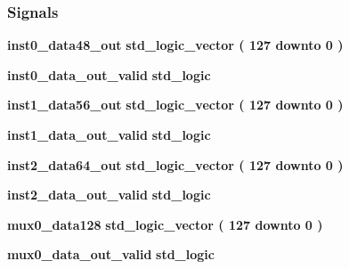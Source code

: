 \subsubsection*{Signals}
 \begin{DoxyCompactItemize}
\item 
{\bf inst0\+\_\+data48\+\_\+out} {\bfseries \textcolor{comment}{std\+\_\+logic\+\_\+vector}\textcolor{vhdlchar}{ }\textcolor{vhdlchar}{(}\textcolor{vhdlchar}{ }\textcolor{vhdlchar}{ } \textcolor{vhdldigit}{127} \textcolor{vhdlchar}{ }\textcolor{keywordflow}{downto}\textcolor{vhdlchar}{ }\textcolor{vhdlchar}{ } \textcolor{vhdldigit}{0} \textcolor{vhdlchar}{ }\textcolor{vhdlchar}{)}\textcolor{vhdlchar}{ }} 
\item 
{\bf inst0\+\_\+data\+\_\+out\+\_\+valid} {\bfseries \textcolor{comment}{std\+\_\+logic}\textcolor{vhdlchar}{ }} 
\item 
{\bf inst1\+\_\+data56\+\_\+out} {\bfseries \textcolor{comment}{std\+\_\+logic\+\_\+vector}\textcolor{vhdlchar}{ }\textcolor{vhdlchar}{(}\textcolor{vhdlchar}{ }\textcolor{vhdlchar}{ } \textcolor{vhdldigit}{127} \textcolor{vhdlchar}{ }\textcolor{keywordflow}{downto}\textcolor{vhdlchar}{ }\textcolor{vhdlchar}{ } \textcolor{vhdldigit}{0} \textcolor{vhdlchar}{ }\textcolor{vhdlchar}{)}\textcolor{vhdlchar}{ }} 
\item 
{\bf inst1\+\_\+data\+\_\+out\+\_\+valid} {\bfseries \textcolor{comment}{std\+\_\+logic}\textcolor{vhdlchar}{ }} 
\item 
{\bf inst2\+\_\+data64\+\_\+out} {\bfseries \textcolor{comment}{std\+\_\+logic\+\_\+vector}\textcolor{vhdlchar}{ }\textcolor{vhdlchar}{(}\textcolor{vhdlchar}{ }\textcolor{vhdlchar}{ } \textcolor{vhdldigit}{127} \textcolor{vhdlchar}{ }\textcolor{keywordflow}{downto}\textcolor{vhdlchar}{ }\textcolor{vhdlchar}{ } \textcolor{vhdldigit}{0} \textcolor{vhdlchar}{ }\textcolor{vhdlchar}{)}\textcolor{vhdlchar}{ }} 
\item 
{\bf inst2\+\_\+data\+\_\+out\+\_\+valid} {\bfseries \textcolor{comment}{std\+\_\+logic}\textcolor{vhdlchar}{ }} 
\item 
{\bf mux0\+\_\+data128} {\bfseries \textcolor{comment}{std\+\_\+logic\+\_\+vector}\textcolor{vhdlchar}{ }\textcolor{vhdlchar}{(}\textcolor{vhdlchar}{ }\textcolor{vhdlchar}{ } \textcolor{vhdldigit}{127} \textcolor{vhdlchar}{ }\textcolor{keywordflow}{downto}\textcolor{vhdlchar}{ }\textcolor{vhdlchar}{ } \textcolor{vhdldigit}{0} \textcolor{vhdlchar}{ }\textcolor{vhdlchar}{)}\textcolor{vhdlchar}{ }} 
\item 
{\bf mux0\+\_\+data\+\_\+out\+\_\+valid} {\bfseries \textcolor{comment}{std\+\_\+logic}\textcolor{vhdlchar}{ }} 

\end{DoxyCompactItemize}
